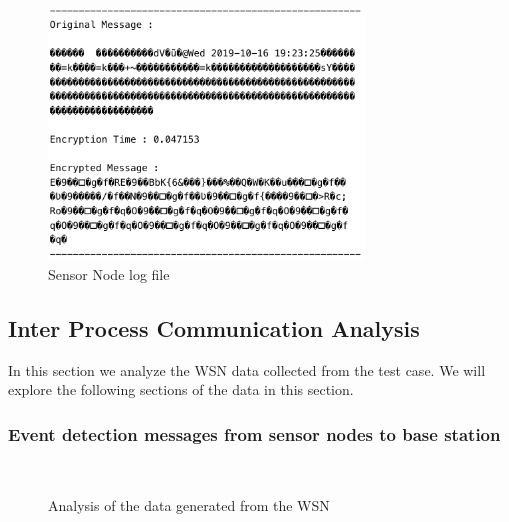 \documentclass[conference]{IEEEtran}
\begin{document}
	\begin{figure}[!h]
		\centering
		\includegraphics[width=3.3in,keepaspectratio]{en}
		\caption{Sensor Node log file}
		\label{Message}
	\end{figure}
	

	\subsection{Inter Process Communication Analysis}
	
	In this section we analyze the WSN data collected from the test case. We will explore the following sections of the data in this section.

	\subsubsection{Event detection messages from sensor nodes to base station}
	
		\begin{figure}[!h]
		\centering
		\caption{Analysis of the data generated from the WSN}
		\\
	\end{figure}	
\end{document}
